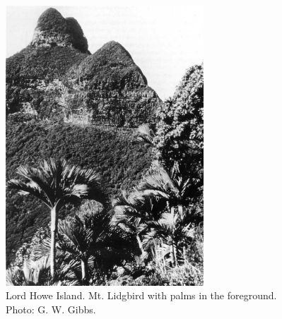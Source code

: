 \begin{figure}
	\includegraphics[width=0.66\textwidth]{graphics/figure120lord-howe-island.jpg}
	\centering
	\caption[Lord Howe Island]{Lord Howe Island.
	Mt. Lidgbird with  palms in the foreground.
	Photo: G. W. Gibbs.}%
	\label{fig:120lord-howe-island}
\end{figure}

